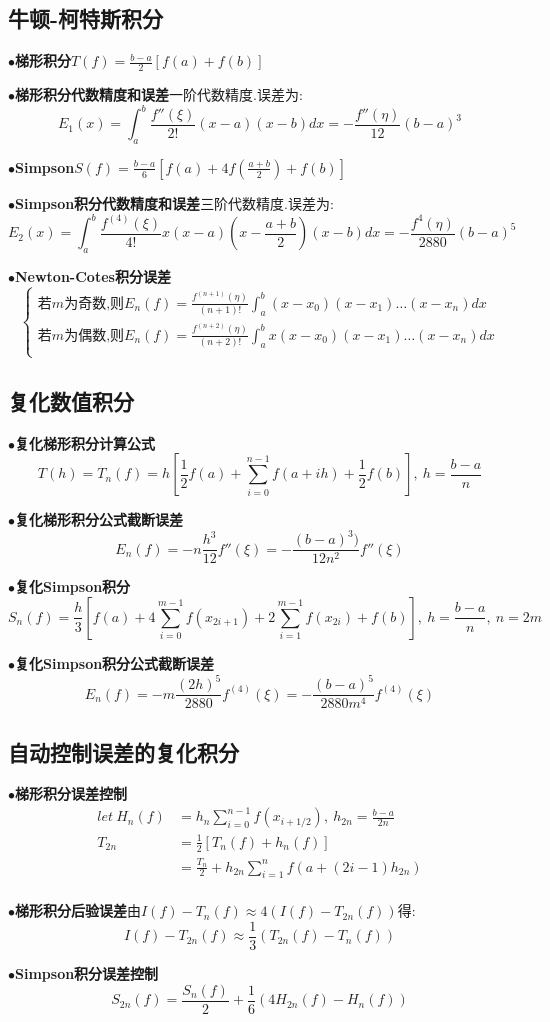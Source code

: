 \documentclass[UTF8]{article}
\newcommand{\keypoint}[2]{$\bullet$\textbf{#1}\quad#2\par}
\begin{document}
\subsection{牛顿-柯特斯积分}
\keypoint{梯形积分}{$T(f)=\frac{b-a}{2}[f(a)+f(b)]$}
\keypoint{梯形积分代数精度和误差}{一阶代数精度.误差为:
	$$E_1(x)=\int_{a}^{b}\frac{f''(\xi)}{2!}(x-a)(x-b)dx=-\frac{f''(\eta)}{12}(b-a)^3$$
}
\keypoint{Simpson}{$S(f)=\frac{b-a}{6}\left[f(a)+4f(\frac{a+b}{2})+f(b)\right]$}
\keypoint{Simpson积分代数精度和误差}{三阶代数精度.误差为:
	$$E_2(x)=\int_{a}^{b}\frac{f^{(4)}(\xi)}{4!}x(x-a)(x-\frac{a+b}{2})(x-b)dx=-\frac{f^{4}(\eta)}{2880}(b-a)^5$$
}
\keypoint{Newton-Cotes积分误差}{
	$$ \left\{
	\begin{array}{l}
	\mbox{若$m$为奇数,则}E_n(f)=\frac{f^{(n+1)}(\eta)}{(n+1)!}\int_{a}^{b}(x-x_0)(x-x_1)\dots(x-x_n)dx\\
	\mbox{若$m$为偶数,则}E_n(f)=\frac{f^{(n+2)}(\eta)}{(n+2)!}\int_{a}^{b}x(x-x_0)(x-x_1)\dots(x-x_n)dx\\
	\end{array}
	\right. $$
}
\subsection{复化数值积分}
\keypoint{复化梯形积分计算公式}{$$T(h)=T_n(f)=h\left[\frac{1}{2}f(a)+\sum\limits_{i=0}^{n-1}f(a+ih)+\frac{1}{2}f(b)\right],\ h=\frac{b-a}{n}$$}
\keypoint{复化梯形积分公式截断误差}{$$E_n(f)=-n\frac{h^3}{12}f''(\xi)=-\frac{(b-a)^3)}{12n^2}f''(\xi)$$}
\keypoint{复化Simpson积分}{$$S_n(f)=\frac{h}{3}\left[f(a)+4\sum\limits_{i=0}^{m-1}f(x_{2i+1})+2\sum\limits_{i=1}^{m-1}f(x_{2i})+f(b)\right],\ h=\frac{b-a}{n},\ n=2m$$}
\keypoint{复化Simpson积分公式截断误差}{$$E_n(f)=-m\frac{(2h)^5}{2880}f^{(4)}(\xi)=-\frac{(b-a)^5}{2880m^4}f^{(4)}(\xi)$$}
\subsection{自动控制误差的复化积分}
\keypoint{梯形积分误差控制}{
	\begin{align*}
	let\ H_n(f)&=h_n\sum\limits_{i=0}^{n-1}f(x_{i+1/2}),\ h_{2n}=\frac{b-a}{2n}\\
	T_{2n}&=\frac{1}{2}[T_n(f)+h_n(f)]\\
	&=\frac{T_n}{2}+h_{2n}\sum\limits_{i=1}^{n}f(a+(2i-1)h_{2n})\\
	\end{align*}
	
}
\keypoint{梯形积分后验误差}{由$I(f)-T_n(f)\approx4(I(f)-T_{2n}(f))$得:$$I(f)-T_{2n}(f)\approx\frac{1}{3}(T_{2n}(f)-T_n(f))$$}
\keypoint{Simpson积分误差控制}{$$S_{2n}(f)=\frac{S_n(f)}{2}+\frac{1}{6}(4H_{2n}(f)-H_n(f))$$}
\end{document}

